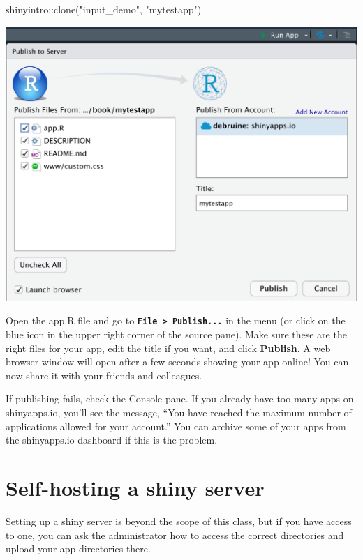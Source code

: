 \documentclass[
]{book}
\newenvironment{Shaded}{\begin{snugshade}}{\end{snugshade}}
\newcommand{\FunctionTok}[1]{\textcolor[rgb]{0.00,0.00,0.00}{#1}}
\newcommand{\NormalTok}[1]{#1}
\newcommand{\SpecialCharTok}[1]{\textcolor[rgb]{0.00,0.00,0.00}{#1}}
\newcommand{\StringTok}[1]{\textcolor[rgb]{0.31,0.60,0.02}{#1}}
\begin{document}
\begin{Shaded}
\begin{Highlighting}[]
\NormalTok{shinyintro}\SpecialCharTok{::}\FunctionTok{clone}\NormalTok{(}\StringTok{"input\_demo"}\NormalTok{, }\StringTok{"mytestapp"}\NormalTok{)}
\end{Highlighting}
\end{Shaded}

\includegraphics{images/saio_publish.png}

Open the app.R file and go to \textbf{\texttt{File\ \textgreater{}\ Publish...}} in the menu (or click on the blue icon in the upper right corner of the source pane). Make sure these are the right files for your app, edit the title if you want, and click \textbf{Publish}. A web browser window will open after a few seconds showing your app online! You can now share it with your friends and colleagues.

If publishing fails, check the Console pane. If you already have too many apps on shinyapps.io, you'll see the message, ``You have reached the maximum number of applications allowed for your account.'' You can archive some of your apps from the shinyapps.io dashboard if this is the problem.

\hypertarget{self-hosting-a-shiny-server}{%
\section{Self-hosting a shiny server}\label{self-hosting-a-shiny-server}}

Setting up a shiny server is beyond the scope of this class, but if you have access to one, you can ask the administrator how to access the correct directories and upload your app directories there.
\end{document}
